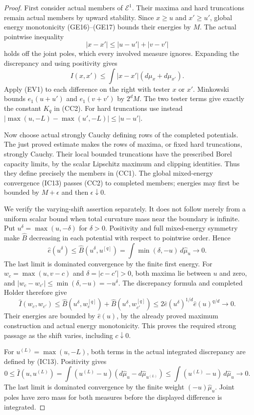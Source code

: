 \documentclass[11pt,a4paper]{article}
\numberwithin{equation}{section}
\theoremstyle{definition}
\theoremstyle{remark}
\begin{document}
\begin{proof}
First consider actual members of $\mathcal E^1$.
Their maxima and hard truncations remain actual members by
upward stability. Since $x\geq u$ and $x'\geq u'$, global
energy monotonicity (GE16)--(GE17) bounds their energies by $M$.
The actual pointwise inequality
\[
                    |x-x'|\leq|u-u'|+|v-v'|
\]
holds off the joint poles, which every involved measure ignores.
Expanding the discrepancy and using positivity gives
\[
 I(x,x')\leq\int|x-x'|(d\mu_x+d\mu_{x'}).
\]
Apply (EV1) to each difference on the right with tester $x$
or $x'$. Minkowski bounds $e_1(u+u')$ and $e_1(v+v')$ by
$2^dM$. The two tester terms give exactly the constant $K_q$
in (CC2). For hard truncations use instead
$|\max(u,-L)-\max(u',-L)|\leq|u-u'|$.

Now choose actual strongly Cauchy defining rows of the
completed potentials. The just proved estimate makes the
rows of maxima, or fixed hard truncations, strongly Cauchy.
Their local bounded truncations have the prescribed Borel
capacity limits, by the scalar Lipschitz maximum and clipping
identities. Thus they define precisely the members in (CC1).
The global mixed-energy convergence (IC13) passes (CC2) to
completed members; energies may first be bounded by $M+\epsilon$
and then $\epsilon\downarrow0$.

We verify the varying-shift assertion separately. It does not
follow merely from a uniform scalar bound when total curvature
mass near the boundary is infinite. Put
$u^\delta=\max(u,-\delta)$ for $\delta>0$. Positivity and
full mixed-energy symmetry make $\widehat B$ decreasing in
each potential with respect to pointwise order. Hence
\[
 \widehat e(u^\delta)
    \leq\widehat B(u^\delta,u^{[q]})
    =\int\min(\delta,-u)\,d\widehat\mu_u
                                      \longrightarrow0.
 \tag{CC2a}
\]
The last limit is dominated convergence by the finite first
energy. For $w_c=\max(u,v-c)$ and $\delta=|c-c'|>0$,
both maxima lie between $u$ and zero, and
$|w_c-w_{c'}|\leq\min(\delta,-u)=-u^\delta$.
The discrepancy formula and completed Holder therefore give
\[
 \widehat I(w_c,w_{c'})
   \leq\widehat B(u^\delta,w_c^{[q]})
          +\widehat B(u^\delta,w_{c'}^{[q]})
   \leq2\widehat e(u^\delta)^{1/d}\widehat e(u)^{q/d}
                                      \longrightarrow0.
 \tag{CC2b}
\]
Their energies are bounded by $\widehat e(u)$, by the already
proved maximum construction and actual energy monotonicity.
This proves the required strong passage as the shift varies,
including $c\downarrow0$.

For $u^{(L)}=\max(u,-L)$, both terms in the actual integrated
discrepancy are defined by (IC13). Positivity gives
\[
 0\leq\widehat I(u,u^{(L)})
   =\int(u^{(L)}-u)(d\widehat\mu_u-d\widehat\mu_{u^{(L)}})
   \leq\int(u^{(L)}-u)\,d\widehat\mu_u\longrightarrow0.
 \tag{CC4}
\]
The last limit is dominated convergence by the finite weight
$(-u)\widehat\mu_u$. Joint poles have zero mass for both
measures before the displayed difference is integrated.
\end{proof}
\end{document}
